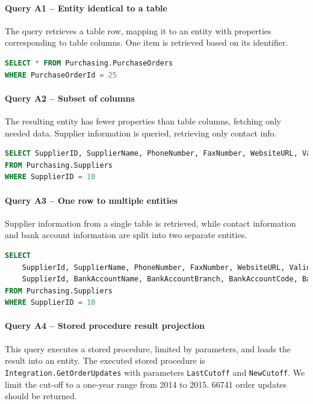 \paragraph{Query A1 -- Entity identical to a table}
\label{query:a1}
The query retrieves a table row, mapping it to an entity with properties corresponding to table columns. One item is retrieved based on its identifier.

\begin{lstlisting}[language=SQL]
SELECT * FROM Purchasing.PurchaseOrders 
WHERE PurchaseOrderId = 25
\end{lstlisting}

\paragraph{Query A2 -- Subset of columns}
\label{query:a2}
The resulting entity has fewer properties than table columns, fetching only needed data. Supplier information is queried, retrieving only contact info.

\begin{lstlisting}[language=SQL]
SELECT SupplierID, SupplierName, PhoneNumber, FaxNumber, WebsiteURL, ValidFrom, ValidTo 
FROM Purchasing.Suppliers 
WHERE SupplierID = 10
\end{lstlisting}

\paragraph{Query A3 -- One row to multiple entities}
\label{query:a3}
Supplier information from a single table is retrieved, while contact information and bank account information are split into two separate entities. 

\begin{lstlisting}[language=SQL]
SELECT 
    SupplierId, SupplierName, PhoneNumber, FaxNumber, WebsiteURL, ValidFrom, ValidTo, 
    SupplierId, BankAccountName, BankAccountBranch, BankAccountCode, BankAccountNumber, BankInternationalCode 
FROM Purchasing.Suppliers 
WHERE SupplierID = 10
\end{lstlisting}

\paragraph{Query A4 -- Stored procedure result projection}
\label{query:a4}
This query executes a stored procedure, limited by parameters, and loads the result into an entity.
The executed stored procedure is \texttt{Integration.GetOrderUpdates} with parameters \texttt{LastCutoff} and \texttt{NewCutoff}. 
We limit the cut-off to a one-year range from 2014 to 2015. 66741 order updates should be returned.

